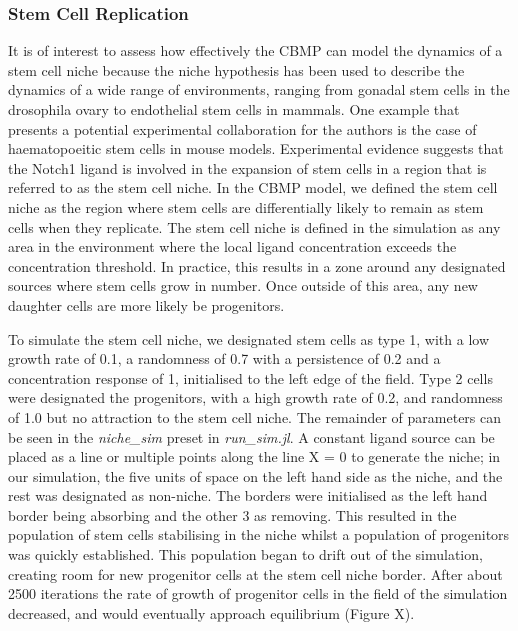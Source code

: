 \documentclass[12pt]{article}
\begin{document}
\begin{figure}[H]
\centering
\end{figure}

\subsubsection{Stem Cell Replication}
It is of interest to assess how effectively the CBMP can model the 
dynamics of a stem cell niche because the niche hypothesis has been used 
to describe the dynamics of a wide range of environments, ranging from 
gonadal stem cells in the drosophila ovary to endothelial stem cells in 
mammals.\cite{linheng05} One example that presents a potential experimental 
collaboration for the authors is the case of haematopoeitic stem cells in 
mouse models. Experimental evidence suggests that the Notch1 ligand is 
involved in the expansion of stem cells in a region that is referred to 
as the stem cell niche.\cite{calvi03} In the CBMP model, we defined the stem cell 
niche as the region where stem cells are differentially likely to remain 
as stem cells when they replicate. The stem cell niche is defined in the 
simulation as any area in the environment where the local ligand 
concentration exceeds the concentration threshold. In practice, this 
results in a zone around any designated sources where stem cells grow in 
number. Once outside of this area, any new daughter cells are more 
likely be progenitors. 

To simulate the stem cell niche, we designated stem cells as type 1, 
with a low growth rate of 0.1, a randomness of 0.7 with a persistence of 
0.2 and a concentration response of 1, initialised to the left edge of 
the field. Type 2 cells were designated the progenitors, with a high 
growth rate of 0.2, and randomness of 1.0 but no attraction to the stem 
cell niche. The remainder of parameters can be seen in the {\itshape 
niche\_sim} preset in {\itshape run\_sim.jl}. A constant ligand source can be 
placed as a line or multiple points along the line X = 0 to generate the 
niche; in our simulation, the five units of space on the left hand side 
as the niche, and the rest was designated as non-niche. The borders were 
initialised as the left hand border being absorbing and the other 3 as 
removing. This resulted in the population of stem cells stabilising in 
the niche whilst a population of progenitors was quickly established. 
This population began to drift out of the simulation, creating room for 
new progenitor cells at the stem cell niche border. After about 2500 
iterations the rate of growth of progenitor cells in the field of the 
simulation decreased, and would eventually approach equilibrium (Figure 
X).
\end{document}
